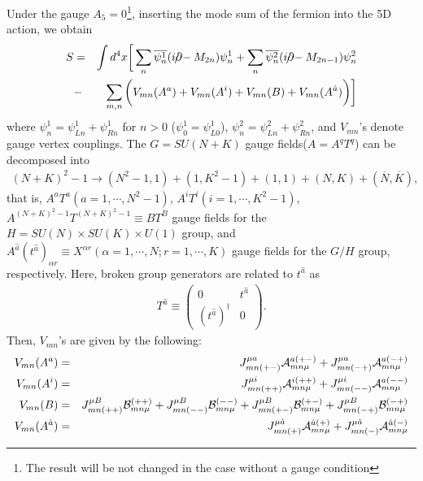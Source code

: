 \documentclass[a4paper,12pt]{article}
\begin{document}
Under the gauge $A_5=0$\footnote{The result will be not changed 
in the case without a gauge condition\cite{barbieri}}, 
inserting the mode sum of the fermion
into the 5D action, we obtain
\begin{eqnarray}
S&=&\int d^4 x\bigg[\sum_{n}\overline{\psi^1_n}
(i\partial\hspace{-2.5mm}/-M_{2n})
\psi^1_n+\sum_n\overline{\psi^2_n}(i\partial\hspace{-2.5mm}/-M_{2n-1})\psi^2_n
\nonumber \\
&-&\sum_{m,n}\bigg(V_{mn}(A^a)+V_{mn}(A^i)+V_{mn}(B)+V_{mn}(A^{\hat
a})\bigg)\bigg]
\end{eqnarray}
where $\psi^1_n=\psi^1_{Ln}+\psi^1_{Rn}$ for $n>0$
($\psi^1_0=\psi^1_{L0}$), $\psi^2_n=\psi^2_{Ln}+\psi^2_{Rn}$, and 
$V_{mn}$'s denote gauge vertex couplings. The $G=SU(N+K)$ gauge
fields($A=A^q T^q$) can be decomposed into 
\begin{eqnarray}
(N+K)^2-1\rightarrow (N^2-1,1)+(1,K^2-1)+(1,1)
+(N,K)+(\overline{N},\overline{K}),
\end{eqnarray}
that is, $A^aT^a(a=1,\cdots,
N^2-1)$, $A^iT^i(i=1,\cdots,K^2-1)$, 
$A^{(N+K)^2-1}T^{(N+K)^2-1}\equiv B T^B$ gauge fields 
for the $H=SU(N)\times SU(K)\times U(1)$ group, 
and $A^{\hat a }(t^{\hat a})_{\alpha r}\equiv X^{\alpha r}
(\alpha=1,\cdots,N;r=1,\cdots,K)$
gauge fields for the $G/H$ group, respectively. 
Here, broken group generators are related to $t^{\hat a}$ as 
\begin{eqnarray}
T^{\hat a}\equiv 
\left(\begin{array}{rr}
0 & t^{\hat a}\\ (t^{\hat a})^\dagger & 0
\end{array}\right).
\end{eqnarray}
Then, $V_{mn}$'s are given by the following:
\begin{eqnarray}
V_{mn}(A^a)&=&J^{\mu a }_{mn(+-)}{\cal A}^{a(+-)}_{mn\mu}
+J^{\mu a}_{mn(-+)}{\cal A}^{a(-+)}_{mn\mu} \nonumber \\
V_{mn}(A^i)&=&J^{\mu i}_{mn(++)}{\cal A}^{i(++)}_{mn\mu}
+J^{\mu i}_{mn(--)}{\cal A}^{a(--)}_{mn\mu} \nonumber \\
V_{mn}(B)&=&J^{\mu B}_{mn(++)}{\cal B}^{(++)}_{mn\mu}
+J^{\mu B}_{mn(--)}{\cal B}^{(--)}_{mn\mu}+J^{\mu B}_{mn(+-)}{\cal
B}^{(+-)}_{mn\mu} +J^{\mu B}_{mn(-+)}{\cal
B}^{(-+)}_{mn\mu}\nonumber\\
V_{mn}(A^{\hat a})&=&J^{\mu{\hat a}}_{mn(+)}{\cal A}^{{\hat a}(+)}_{mn\mu} 
+J^{\mu{\hat a}}_{mn(-)}{\cal A}^{{\hat a}(-)}_{mn\mu}
\end{eqnarray}
\end{document}
